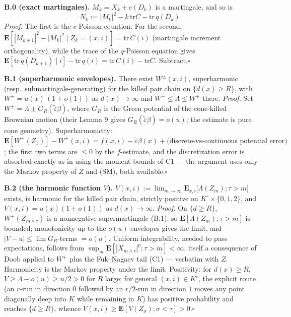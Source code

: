\documentclass[11pt]{article}
\newcommand{\E}{\mathbf{E}}\newcommand{\Lat}{\mathcal{L}}\renewcommand{\Pr}{\mathbf{P}}
\begin{document}
\textbf{B.0 (exact martingales).} $M_k=X_k+c(D_k)$ is a martingale, and so is
$$N_k:=|M_k|^2-k\,\mathrm{tr}\bar C-\mathrm{tr}\,q(D_k).$$
\emph{Proof.} The first is the $c$-Poisson equation. For the second,
$\E[|M_{k+1}|^2-|M_k|^2\mid Z_k=(x,i)]=\mathrm{tr}\,C(i)$ (martingale increment
orthogonality), while the trace of the $q$-Poisson equation gives
$\E[\mathrm{tr}\,q(D_{k+1})\mid i]-\mathrm{tr}\,q(i)=\mathrm{tr}\,C(i)-\mathrm{tr}\bar C$.
Subtract.\hfill$\square$

\textbf{B.1 (superharmonic envelopes).} There exist $W^\pm(x,i)$, superharmonic
(resp.\ submartingale-generating) for the killed pair chain on $\{d(x)\ge R\}$, with
$W^\pm=u(x)\,(1+o(1))$ as $d(x)\to\infty$ and $W^-\le\Lambda\le W^+$ there.
\emph{Proof.} Set $W^\pm=\Lambda\pm G_R(\widetilde\varepsilon\beta)$, where $G_R$ is the
Green potential of the cone-killed Brownian motion (their Lemma 9 gives
$G_R(\widetilde\varepsilon\beta)=o(u)$; the estimate is pure cone geometry). Superharmonicity:
$\E[W^+(Z_1)]-W^+(x,i)=f(x,i)-\widetilde\varepsilon\beta(x)+
\big(\text{discrete-vs-continuous potential error}\big)$; the first two terms are
$\le0$ by the $f$-estimate, and the discretization error is absorbed exactly as in
\cite[proof of Lemma 12]{DZ} using the moment bounds of C1 --- the argument uses only the
Markov property of $Z$ and (SM), both available.\hfill$\square$

\textbf{B.2 (the harmonic function $V$).}
$V(x,i):=\lim_{m\to\infty}\E_{x,i}\big[\Lambda(Z_m);\tau>m\big]$ exists, is harmonic for
the killed pair chain, strictly positive on $K^\circ\times\{0,1,2\}$, and
$V(x,i)=u(x)(1+o(1))$ as $d(x)\to\infty$.
\emph{Proof.} On $\{d\ge R\}$, $W^+(Z_{m\wedge\tau})$ is a nonnegative supermartingale
(B.1), so $\E[\Lambda(Z_m);\tau>m]$ is bounded; monotonicity up to the $o(u)$ envelopes
gives the limit, and $|V-u|\le\lim G_R$-terms $=o(u)$. Uniform integrability, needed to
pass expectations, follows from $\sup_m\E[|X_{m\wedge\tau}|^p;\tau>m]<\infty$, itself a
consequence of Doob applied to $W^+$ plus the Fuk--Nagaev tail (C1) --- \cite[Lemma
14]{DZ} verbatim with $Z$. Harmonicity is the Markov property under the limit. Positivity:
for $d(x)\ge R$, $V\ge\Lambda-o(u)\ge u/2>0$ for $R$ large; for general
$(x,i)\in K^\circ$, the explicit route (an $r$-run in direction $0$ followed by an
$r/2$-run in direction $1$ moves any point diagonally deep into $K$ while remaining in
$K$) has positive probability and reaches $\{d\ge R\}$, whence
$V(x,i)\ge\E[V(Z_\sigma);\sigma<\tau]>0$.\hfill$\square$
\end{document}
